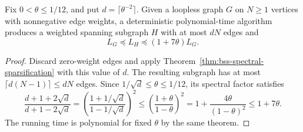 \begin{lemma}\label{lem:bss-sparsification-bound}
Fix $0<\theta\le1/12$, and put $d=\lceil\theta^{-2}\rceil$.
Given a loopless graph $G$ on $N\ge1$ vertices with nonnegative
edge weights, a deterministic polynomial-time algorithm produces
a weighted spanning subgraph $H$ with at most $dN$ edges and
\[
 L_G\preceq L_H\preceq(1+7\theta)L_G.
\]
\end{lemma}

\begin{proof}
Discard zero-weight edges and apply
Theorem~\ref{thm:bss-spectral-sparsification} with this value of $d$.
The resulting subgraph has at most $\lceil d(N-1)\rceil\le dN$
edges. Since $1/\sqrt d\le\theta\le1/12$, its spectral factor satisfies
\[
 \frac{d+1+2\sqrt d}{d+1-2\sqrt d}
 =\left(\frac{1+1/\sqrt d}{1-1/\sqrt d}\right)^2
 \le\left(\frac{1+\theta}{1-\theta}\right)^2
 =1+\frac{4\theta}{(1-\theta)^2}
 \le1+7\theta.
\]
The running time is polynomial for fixed $\theta$ by the same theorem.
\end{proof}
